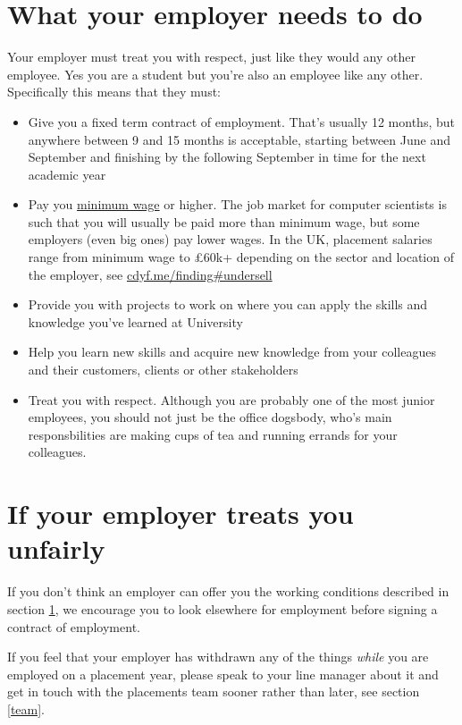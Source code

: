 \documentclass[
]{book}
\providecommand{\tightlist}{%
  \setlength{\itemsep}{0pt}\setlength{\parskip}{0pt}}
\begin{document}
\section{What your employer needs to do}\label{eq}

Your employer must treat you with respect, just like they would any other employee. Yes you are a student but you're also an employee like any other. Specifically this means that they must:

\begin{itemize}
\tightlist
\item
  Give you a fixed term contract of employment. That's usually 12 months, but anywhere between 9 and 15 months is acceptable, starting between June and September and finishing by the following September in time for the next academic year \citep{employee}
\item
  Pay you \href{https://www.gov.uk/national-minimum-wage}{minimum wage} or higher. \citep{minimumwage} The job market for computer scientists is such that you will usually be paid more than minimum wage, but some employers (even big ones) pay lower wages. In the UK, placement salaries range from minimum wage to £60k+ depending on the sector and location of the employer, see \href{https://cdyf.me/finding\#undersell}{cdyf.me/finding\#undersell} \citep{finding}
\item
  Provide you with projects to work on where you can apply the skills and knowledge you've learned at University
\item
  Help you learn new skills and acquire new knowledge from your colleagues and their customers, clients or other stakeholders
\item
  Treat you with respect. Although you are probably one of the most junior employees, you should not just be the office dogsbody, who's main responsbilities are making cups of tea and running errands for your colleagues.
\end{itemize}

\section{If your employer treats you unfairly}\label{unfair}

If you don't think an employer can offer you the working conditions described in section \ref{eq}, we encourage you to look elsewhere for employment before signing a contract of employment.

If you feel that your employer has withdrawn any of the things \emph{while} you are employed on a placement year, please speak to your line manager about it and get in touch with the placements team sooner rather than later, see section \ref{team}.
\end{document}
